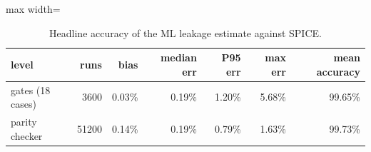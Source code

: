\begin{table}[H]
\centering
{\small
\begin{adjustbox}{max width=\linewidth}
\begin{tabular}{lrrrrrr}
\toprule
level & runs & bias & median err & P95 err & max err & mean accuracy \\
\midrule
gates (18 cases) & 3600 & 0.03\% & 0.19\% & 1.20\% & 5.68\% & 99.65\% \\
parity checker & 51200 & 0.14\% & 0.19\% & 0.79\% & 1.63\% & 99.73\% \\
\bottomrule
\end{tabular}
\end{adjustbox}
}
\caption{Headline accuracy of the ML leakage estimate against SPICE.}
\label{tab:headline}
\end{table}

